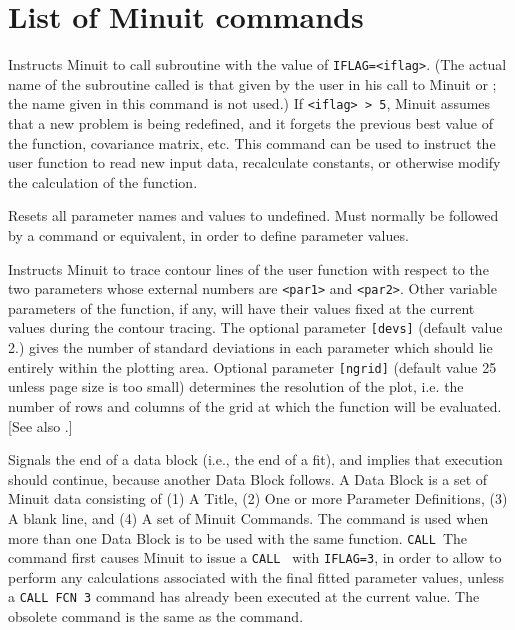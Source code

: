 \section*{List of Minuit commands}


Instructs Minuit to call subroutine  with the value of
\texttt{IFLAG=<iflag>}.
(The actual name of the subroutine called is that given by the user
in his call to Minuit or ;
the name given in this command is not used.)
If \texttt{<iflag> > 5}, Minuit assumes that a new problem is being
redefined, and it forgets the previous best value of the function,
covariance matrix, etc.
This command can be used to instruct the user function to read new
input data, recalculate constants, or otherwise modify the calculation
of the function.


Resets all parameter names and values to undefined. Must normally be
followed by a  command or equivalent, in order to define
parameter values.


Instructs Minuit to trace contour lines of the user function with
respect to the two parameters whose external numbers are \texttt{<par1>}
and \texttt{<par2>}.
Other variable parameters of the function, if any, will have their
values fixed at the current values during the contour tracing.
The optional parameter \texttt{[devs]} (default value 2.) gives the number of
standard deviations in each parameter which should lie entirely within
the plotting area. 
Optional parameter \texttt{[ngrid]} (default value 25 unless
page size is too small) determines the resolution of the plot, i.e.
the number of rows and columns of the grid at which the function
will be evaluated. [See also .]


Signals the end of a data block (i.e., the end of a fit), and implies that
execution should continue, because another Data Block follows.  
A Data Block is a set of Minuit data
consisting of (1) A Title, (2) One or more Parameter Definitions,
(3) A blank line, and (4) A set of Minuit Commands.
The  command is used when more than one Data Block is to be used
with the same  function.
\texttt{CALL}~The  command first causes Minuit to issue a \texttt{CALL}~
with \texttt{IFLAG=3},
in order to allow  to perform any calculations associated with
the final fitted parameter values,
unless a \texttt{CALL FCN 3} command has already been executed
at the current  value.
The obsolete command 
is the same as the  command.

